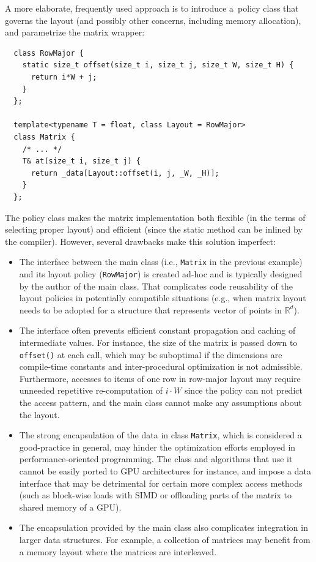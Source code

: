 A more elaborate, frequently used approach is to introduce a~policy class that governs the layout (and possibly other concerns, including memory allocation), and parametrize the matrix wrapper:

\begin{verbatim}
  class RowMajor {
    static size_t offset(size_t i, size_t j, size_t W, size_t H) {
      return i*W + j;  
    }
  };

  template<typename T = float, class Layout = RowMajor>
  class Matrix {
    /* ... */
    T& at(size_t i, size_t j) {
      return _data[Layout::offset(i, j, _W, _H)];
    }
  };
\end{verbatim}

The policy class makes the matrix implementation both flexible (in the terms of selecting proper layout) and efficient (since the static method can be inlined by the compiler). However, several drawbacks make this solution imperfect:

\begin{itemize}
    \item The interface between the main class (i.e., \texttt{Matrix} in the previous example) and its layout policy (\texttt{RowMajor}) is created ad-hoc and is typically designed by the author of the main class. That complicates code reusability of the layout policies in potentially compatible situations (e.g., when matrix layout needs to be adopted for a structure that represents vector of points in $\mathbb{R}^d$).
    \item The interface often prevents efficient constant propagation and caching of intermediate values. For instance, the size of the matrix is passed down to \texttt{offset()} at each call, which may be suboptimal if the dimensions are compile-time constants and inter-procedural optimization is not admissible. Furthermore, accesses to items of one row in row-major layout may require unneeded repetitive re-computation of $i\cdot W$ since the policy can not predict the access pattern, and the main class cannot make any assumptions about the layout.
    \item The strong encapsulation of the data in class \texttt{Matrix}, which is considered a good-practice in general, may hinder the optimization efforts employed in performance-oriented programming. The class and algorithms that use it cannot be easily ported to GPU architectures for instance, and impose a data interface that may be detrimental for certain more complex access methods (such as block-wise loads with SIMD or offloading parts of the matrix to shared memory of a GPU).
    \item The encapsulation provided by the main class also complicates integration in larger data structures. For example, a collection of matrices may benefit from a memory layout where the matrices are interleaved.
\end{itemize}

